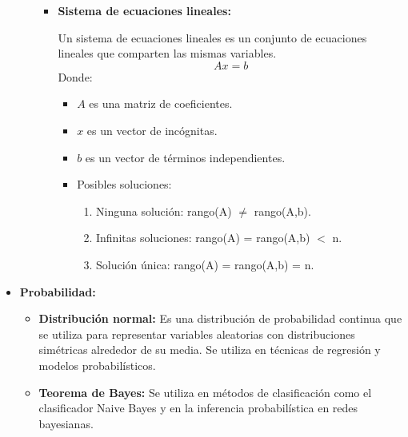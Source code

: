 \documentclass{templateApunte}
\begin{document}
\begin{itemize}
\begin{itemize}
\begin{itemize}
      \item \hypertarget{sistemaLineal}{\textbf{Sistema de ecuaciones lineales:}} Un sistema de ecuaciones lineales es un conjunto de ecuaciones lineales que comparten las mismas variables.
      \begin{equation*}
        Ax = b
      \end{equation*}
      Donde:
      \begin{itemize}
        \item $A$ es una matriz de coeficientes.
        \item $x$ es un vector de incógnitas.
        \item $b$ es un vector de términos independientes.
        \item Posibles soluciones:
        \begin{enumerate}
          \item Ninguna solución: rango(A) $\neq$ rango(A,b).
          \item Infinitas soluciones: rango(A) = rango(A,b) $<$ n.
          \item Solución única: rango(A) = rango(A,b) = n.
        \end{enumerate}
      \end{itemize}
    \end{itemize}
  \end{itemize}
  \item \textbf{Probabilidad:}
  \begin{itemize}
    \item \textbf{Distribución normal:} Es una distribución de probabilidad continua que se utiliza para representar variables aleatorias con distribuciones simétricas alrededor de su media. Se utiliza en técnicas de regresión y modelos probabilísticos.
    \item \textbf{Teorema de Bayes:} Se utiliza en métodos de clasificación como el clasificador Naive Bayes y en la inferencia probabilística en redes bayesianas.
    

\end{itemize}
\end{itemize}
\end{document}
